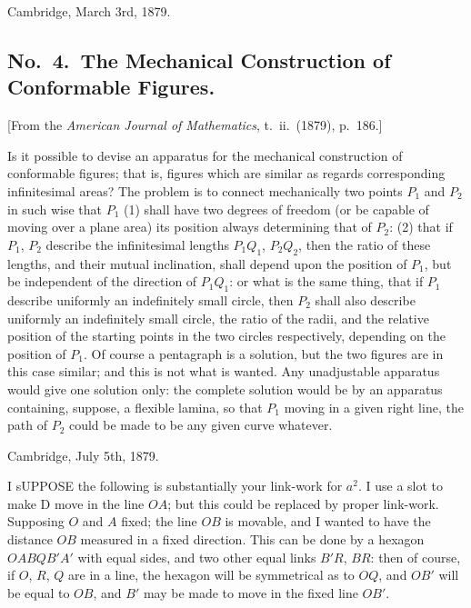 \documentclass[11pt,a4paper]{book}
\begin{document}
Cambridge, March 3rd, 1879.

\subsection*{No.\ 4.\ The Mechanical Construction of Conformable Figures.}

[From the \textit{American Journal of Mathematics}, t.\ ii.\ (1879), p.\ 186.]

\medskip

Is it possible to devise an apparatus for the mechanical construction of conformable figures; that is, figures which are similar as regards corresponding infinitesimal areas? The problem is to connect mechanically two points $P_1$ and $P_2$ in such wise that $P_1$ (1) shall have two degrees of freedom (or be capable of moving over a plane area) its position always determining that of $P_2$: (2) that if $P_1$, $P_2$ describe the infinitesimal lengths $P_1Q_1$, $P_2Q_2$, then the ratio of these lengths, and their mutual inclination, shall depend upon the position of $P_1$, but be independent of the direction of $P_1Q_1$: or what is the same thing, that if $P_1$ describe uniformly an indefinitely small circle, then $P_2$ shall also describe uniformly an indefinitely small circle, the ratio of the radii, and the relative position of the starting points in the two circles respectively, depending on the position of $P_1$. Of course a pentagraph is a solution, but the two figures are in this case similar; and this is not what is wanted. Any unadjustable apparatus would give one solution only: the complete solution would be by an apparatus containing, suppose, a flexible lamina, so that $P_1$ moving in a given right line, the path of $P_2$ could be made to be any given curve whatever.

Cambridge, July 5th, 1879.

\clearpage

I sUPPOSE the following is substantially your link-work for $a^2$. I use a slot to make D move in the line $OA$; but this could be replaced by proper link-work. Supposing $O$ and $A$ fixed; the line $OB$ is movable, and I wanted to have the distance $OB$ measured in a fixed direction. This can be done by a hexagon $OABQB'A'$ with equal sides, and two other equal links $B'R$, $BR$: then of course, if $O$, $R$, $Q$ are in a line, the hexagon will be symmetrical as to $OQ$, and $OB'$ will be equal to $OB$, and $B'$ may be made to move in the fixed line $OB'$.
\end{document}
